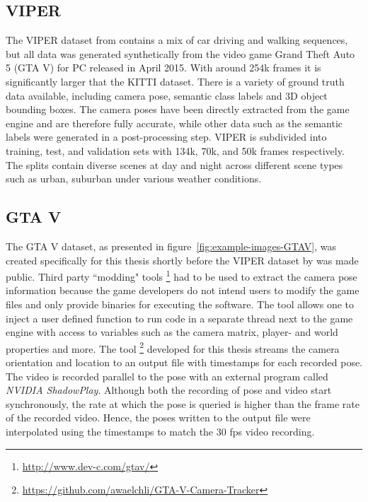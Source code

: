 		\subsection{VIPER}
			The VIPER dataset from \cite{richter2017playing} contains a mix of car driving and walking sequences, but all data was generated synthetically from the video game Grand Theft Auto 5 (GTA V) for PC released in April 2015.
			With around 254k frames it is significantly larger that the KITTI dataset.
			There is a variety of ground truth data available, including camera pose, semantic class labels and 3D object bounding boxes.
			The camera poses have been directly extracted from the game engine and are therefore fully accurate, while other data such as the semantic labels were generated in a post-processing step.
			VIPER is subdivided into training, test, and validation sets with 134k, 70k, and 50k frames respectively.
			The splits contain diverse scenes at day and night across different scene types such as urban, suburban under various weather conditions.
			
		\subsection{GTA V}
			The GTA V dataset, as presented in figure~\ref{fig:example-images-GTAV}, was created specifically for this thesis shortly before the VIPER dataset by \citeauthor{richter2017playing} was made public.
			Third party ``modding" tools%
			\footnote{\url{http://www.dev-c.com/gtav/}}
			had to be used to extract the camera pose information because the game developers do not intend users to modify the game files and only provide binaries for executing the software.
			The tool allows one to inject a user defined \CC\@ function to run code in a separate thread next to the game engine with access to variables such as the camera matrix, player- and world properties and more.
			The tool%
			\footnote{\url{https://github.com/awaelchli/GTA-V-Camera-Tracker}} 
			developed for this thesis streams the camera orientation and location to an output file with timestamps for each recorded pose.
			The video is recorded parallel to the pose with an external program called \emph{NVIDIA ShadowPlay}.
			Although both the recording of pose and video start synchronously, the rate at which the pose is queried is higher than the frame rate of the recorded video.
			Hence, the poses written to the output file were interpolated using the timestamps to match the 30 fps video recording.
			
